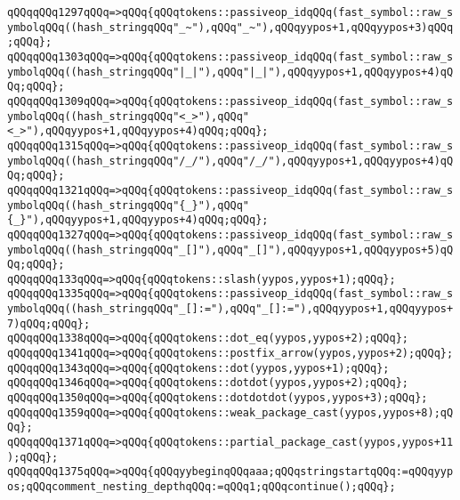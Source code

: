 \verb|qQQqqQQq1297qQQq=>qQQq{qQQqtokens::passiveop_idqQQq(fast_symbol::raw_symbolqQQq((hash_stringqQQq"_~"),qQQq"_~"),qQQqyypos+1,qQQqyypos+3)qQQq;qQQq};|\newline
\verb|qQQqqQQq1303qQQq=>qQQq{qQQqtokens::passiveop_idqQQq(fast_symbol::raw_symbolqQQq((hash_stringqQQq"|\verb#|_|"),qQQq"|_|"),qQQqyypos+1,qQQqyypos+4)qQQq;qQQq};#\newline
\verb|qQQqqQQq1309qQQq=>qQQq{qQQqtokens::passiveop_idqQQq(fast_symbol::raw_symbolqQQq((hash_stringqQQq"<_>"),qQQq"<_>"),qQQqyypos+1,qQQqyypos+4)qQQq;qQQq};|\newline
\verb|qQQqqQQq1315qQQq=>qQQq{qQQqtokens::passiveop_idqQQq(fast_symbol::raw_symbolqQQq((hash_stringqQQq"/_/"),qQQq"/_/"),qQQqyypos+1,qQQqyypos+4)qQQq;qQQq};|\newline
\verb|qQQqqQQq1321qQQq=>qQQq{qQQqtokens::passiveop_idqQQq(fast_symbol::raw_symbolqQQq((hash_stringqQQq"{_}"),qQQq"{_}"),qQQqyypos+1,qQQqyypos+4)qQQq;qQQq};|\newline
\verb|qQQqqQQq1327qQQq=>qQQq{qQQqtokens::passiveop_idqQQq(fast_symbol::raw_symbolqQQq((hash_stringqQQq"_[]"),qQQq"_[]"),qQQqyypos+1,qQQqyypos+5)qQQq;qQQq};|\newline
\verb|qQQqqQQq133qQQq=>qQQq{qQQqtokens::slash(yypos,yypos+1);qQQq};|\newline
\verb|qQQqqQQq1335qQQq=>qQQq{qQQqtokens::passiveop_idqQQq(fast_symbol::raw_symbolqQQq((hash_stringqQQq"_[]:="),qQQq"_[]:="),qQQqyypos+1,qQQqyypos+7)qQQq;qQQq};|\newline
\verb|qQQqqQQq1338qQQq=>qQQq{qQQqtokens::dot_eq(yypos,yypos+2);qQQq};|\newline
\verb|qQQqqQQq1341qQQq=>qQQq{qQQqtokens::postfix_arrow(yypos,yypos+2);qQQq};|\newline
\verb|qQQqqQQq1343qQQq=>qQQq{qQQqtokens::dot(yypos,yypos+1);qQQq};|\newline
\verb|qQQqqQQq1346qQQq=>qQQq{qQQqtokens::dotdot(yypos,yypos+2);qQQq};|\newline
\verb|qQQqqQQq1350qQQq=>qQQq{qQQqtokens::dotdotdot(yypos,yypos+3);qQQq};|\newline
\verb|qQQqqQQq1359qQQq=>qQQq{qQQqtokens::weak_package_cast(yypos,yypos+8);qQQq};|\newline
\verb|qQQqqQQq1371qQQq=>qQQq{qQQqtokens::partial_package_cast(yypos,yypos+11);qQQq};|\newline
\verb|qQQqqQQq1375qQQq=>qQQq{qQQqyybeginqQQqaaa;qQQqstringstartqQQq:=qQQqyypos;qQQqcomment_nesting_depthqQQq:=qQQq1;qQQqcontinue();qQQq};|\newline
